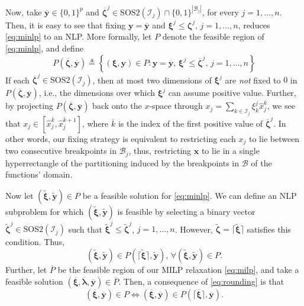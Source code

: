 \documentclass[pdflatex,sn-mathphys-num]{sn-jnl}%
\newcommand{\new}[1]{#1}
\begin{document}
\new{%
Now, take $\overline{\bm{y}} \in \{0,1\}^{p}$ and $\overline{\bm{\zeta}}^j\in \text{SOS2}(\mathcal{I}_j) \cap \{0,1\}^{|\mathcal{B}_j|}$, for every $j=1,\ldots,n$.
Then, it is easy to see that fixing $\bm{y}=\overline{\bm{y}}$ and $\bm{\xi}^j \le \bm{\zeta}^{j},\,j=1,\ldots,n$, reduces \ref{eq:minlp} to an NLP.
More formally, let $P$ denote the feasible region of \ref{eq:minlp}, and define
\begin{equation}\label{eq:nlp-subproblem}
    P(\bm{\overline{\zeta}},\bm{\overline{y}}) \triangleq \left\{ (\bm{\xi},\bm{y}) \in P : \bm{y}=\overline{\bm{y}},\, \bm{\xi}^j\le \overline{\bm{\zeta}}^j,\, j=1,\ldots,n \right\}
\end{equation}}
\new{%
If each $\overline{\bm{\zeta}}^j\in \text{SOS2}(\mathcal{I}_j)$, then at most two dimensions of $\bm{\xi}^j$ are \emph{not} fixed to $0$ in $P(\bm{\overline{\zeta}},\bm{\overline{y}})$, i.e., the dimensions over which $\bm{\xi}^j$ can assume positive value.
   Further, by projecting $P(\bm{\overline{\zeta}},\bm{\overline{y}})$ back onto the $x$-space through $x_{j} = \sum_{k\in\mathcal{I}_j} \xi^j_{k} \hat{x}_{j}^{k}$, we see that $x_j\in [\hat{x}_j^{\overline{k}},\hat{x}_j^{\overline{k}+1}]$, where $\overline{k}$ is the index of the first positive value of $\overline{\bm{\zeta}}^j$.
In other words, our fixing strategy is equivalent to restricting each $x_j$ to lie between two consecutive breakpoints in $\mathcal{B}_j$, thus, restricting $\bm{x}$ to lie in a single hyperrectangle of the partitioning induced by the breakpoints in $\mathcal{B}$ of the functions' domain.
}


\new{%
Now let $(\widetilde{\bm{\xi}},\widetilde{\bm{y}})\in P$ be a feasible solution for \ref{eq:minlp}. 
We can define an NLP subproblem for which $(\widetilde{\bm{\xi}},\widetilde{\bm{y}})$ is feasible by selecting a binary vector $\widetilde{\bm{\zeta}}^j\in\text{SOS2}(\mathcal{I}_j)$ such that $\widetilde{\bm{\xi}}^j\le\widetilde{\bm{\zeta}}^j$, $j=1,\ldots,n$.
However, $\widetilde{\bm{\zeta}} = \lceil \widetilde{\bm{\xi}}\rceil$ satisfies this condition.
Thus,
\begin{equation}\label{eq:rounding}
(\widetilde{\bm{\xi}},\widetilde{\bm{y}})\in P(\lceil \widetilde{\bm{\xi}}\rceil,\widetilde{\bm{y}}), \, \forall (\widetilde{\bm{\xi}},\widetilde{\bm{y}})\in P
.\end{equation}
Further, let $\overline{P}$ be the feasible region of our MILP relaxation \ref{eq:milp}, and take a feasible solution $(\overline{\bm{\xi}}, \overline{\bm{\lambda}}, \overline{\bm{y}}) \in \overline{P}$.
Then, a consequence of \eqref{eq:rounding} is that
\begin{equation}
(\overline{\bm{\xi}},\overline{\bm{y}}) \in P\iff (\overline{\bm{\xi}},\overline{\bm{y}})\in P(\lceil \overline{\bm{\xi}}\rceil,\overline{\bm{y}})
.\end{equation}
}
\end{document}
